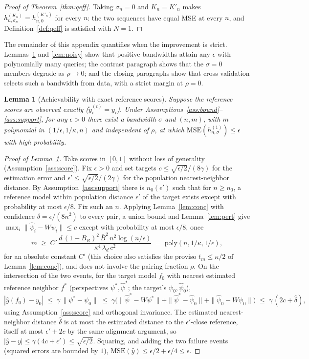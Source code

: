 \documentclass{article}
\newtheorem{lemma}{Lemma}
\theoremstyle{definition}
\theoremstyle{remark}
\theoremstyle{plain}
\begin{document}
\begin{proof}[Proof of Theorem~\ref{thm:qeff}]
Taking $\sigma_{n}=0$ and
$K_{n}=K'_{n}$ makes $h_{n,\sigma_{n}}^{(K_{n})}=h_{n,0}^{(K'_{n})}$ for every $n$:
the two sequences have equal MSE at every $n$, and Definition~\ref{def:qeff} is
satisfied with $N=1$.
\end{proof}

The remainder of this appendix quantifies when the improvement is strict.
Lemmas~\ref{lem:exact} and \ref{lem:noisy} show that positive bandwidths attain any
$\epsilon$ with polynomially many queries; the contrast paragraph shows that the
$\sigma=0$ members degrade as $\rho\to0$; and the closing paragraphs show that
cross-validation selects such a bandwidth from data, with a strict margin at
$\rho=0$.

\begin{lemma}[Achievability with exact reference scores]
\label{lem:exact}
Suppose the reference scores are observed exactly ($\tilde{y}_{i}^{(t)}=y_{i}$).
Under Assumptions~\ref{ass:bound}--\ref{ass:support}, for any $\epsilon>0$ there
exist a bandwidth $\sigma$ and $(n,m)$, with $m$ polynomial in
$(1/\epsilon,1/\kappa,n)$ and independent of $\rho$, at which
$\mathrm{MSE}(h_{n,\sigma}^{(1)})\le\epsilon$ with high probability.
\end{lemma}
\begin{proof}[Proof of Lemma~\ref{lem:exact}]
Take scores in $[0,1]$ without loss of
generality (Assumption~\ref{ass:score}). Fix $\epsilon>0$ and set targets $c\le\sqrt{\epsilon/2}/(8\gamma)$ for
the estimation error and $\epsilon'\le\sqrt{\epsilon/2}/(2\gamma)$ for the population
nearest-neighbor distance. By Assumption~\ref{ass:support} there is $n_0(\epsilon')$ such that for $n\ge n_0$, a
reference model within population distance $\epsilon'$ of the target exists except with
probability at most $\epsilon/8$. Fix such an $n$. Applying Lemma~\ref{lem:conc} with
confidence $\delta=\epsilon/(8n^2)$ to every pair, a union bound and
Lemma~\ref{lem:pert} give $\max_i\|\hat\psi_i-W\psi_i\|\le c$ except with probability at
most $\epsilon/8$, once
\[
m\;\ge\;C'\,\frac{d\,(1+B_R)^2\,\bar B^2\,n^2\log(n/\epsilon)}{\kappa^4\,\lambda_d\,c^2}
\;=\;\mathrm{poly}(n,1/\kappa,1/\epsilon),
\]
for an absolute constant $C'$ (this choice also satisfies the proviso
$t_m\le\kappa/2$ of Lemma~\ref{lem:conc}), and does not involve the pairing fraction
$\rho$. On the intersection of the two
events, for the target model $f_{0}$ with nearest estimated reference neighbor $f^*$
(perspectives $\psi^*,\hat\psi^*$; the target's $\psi_{0},\hat\psi_{0}$),
\[
|\hat y(f_{0})-y_{0}|\;\le\;\gamma\,\|\psi^*-\psi_{0}\|\;\le\;
\gamma\big(\|\hat\psi^*-W\psi^*\|+\|\hat\psi^*-\hat\psi_{0}\|+\|\hat\psi_{0}-W\psi_{0}\|\big)
\;\le\;\gamma\,(2c+\hat\delta),
\]
using Assumption~\ref{ass:score} and orthogonal invariance. The estimated nearest-neighbor distance
$\hat\delta$ is at most the estimated distance to the $\epsilon'$-close reference, itself
at most $\epsilon'+2c$ by the same alignment argument, so
$|\hat y-y|\le\gamma(4c+\epsilon')\le\sqrt{\epsilon/2}$. Squaring, and adding the two
failure events (squared errors are bounded by $1$),
$\mathrm{MSE}(\hat y)\le\epsilon/2+\epsilon/4\le\epsilon$.
\end{proof}
\end{document}
